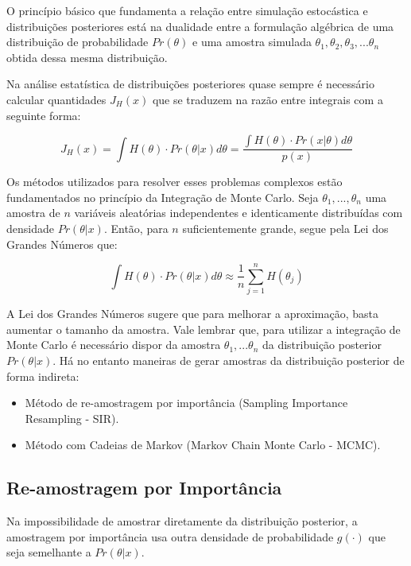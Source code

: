 O princípio básico que fundamenta a relação entre simulação estocástica e distribuições posteriores está na dualidade entre a formulação algébrica de uma distribuição de probabilidade $Pr(\theta)$ e uma amostra simulada ${\theta_1,\theta_2,\theta_3, ...\theta_n}$ obtida dessa mesma distribuição.

Na análise estatística de distribuições posteriores quase sempre é necessário calcular quantidades $J_H(x)$ que se traduzem na razão entre integrais com a seguinte forma:

\begin{equation}
    J_H(x) = \int{H(\theta)\cdot Pr(\theta|x) d\theta} = \frac{\int{H(\theta)\cdot Pr(x|\theta) d\theta}}{p(x)}
\end{equation}

Os métodos utilizados para resolver esses problemas complexos estão fundamentados no princípio da Integração de Monte Carlo. Seja ${\theta_1, ...,\theta_n}$ uma amostra de $n$ variáveis aleatórias independentes e identicamente distribuídas com densidade $Pr(\theta|x)$. Então, para $n$ suficientemente grande, segue pela Lei dos Grandes Números que:

\begin{equation}
    \int{H(\theta)\cdot Pr(\theta|x) d\theta} \approx \frac{1}{n} \sum_{j=1}^{n}{H(\theta_j)}
\end{equation}

A Lei dos Grandes Números sugere que para melhorar a aproximação, basta aumentar o tamanho da amostra. Vale lembrar que, para utilizar a integração de Monte Carlo é necessário dispor da amostra ${\theta_1, ...\theta_n}$ da distribuição posterior $Pr(\theta|x)$. Há no entanto maneiras de gerar amostras da distribuição posterior de forma indireta:

\begin{itemize}
    \item Método de re-amostragem por importância (Sampling Importance Resampling - SIR).
    \item Método com Cadeias de Markov (Markov Chain Monte Carlo - MCMC).
\end{itemize}

\subsection{Re-amostragem por Importância}

Na impossibilidade de amostrar diretamente da distribuição posterior, a amostragem por importância usa outra densidade de probabilidade $g(\cdot)$ que seja semelhante a $Pr(\theta|x)$.

